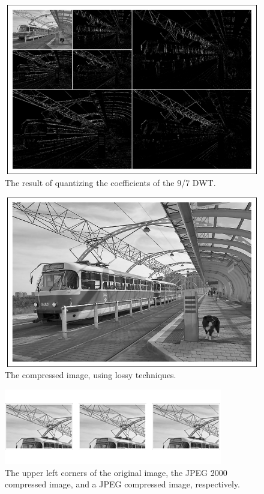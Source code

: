 \documentclass[titlepage,12pt]{article}
\begin{document}
\begin{figure}
	\centering
	\includegraphics[scale=0.25]{resources/example/exampleQuant.png}
	\caption{The result of quantizing the coefficients of the 9/7 DWT.}
	\label{fig:exampleQuant}
\end{figure}

\begin{figure}
	\centering
	\includegraphics[scale=0.25]{resources/example/exampleCompressed.png}
	\caption{The compressed image, using lossy techniques.}
	\label{fig:exampleCompressed}
\end{figure}

\begin{figure}
	\centering
	\includegraphics{resources/example/corners.png}
	\caption{The upper left corners of the original image, the JPEG 2000 compressed image, 
	and a JPEG compressed image, respectively.}
	\label{fig:corners}
\end{figure}
\end{document}
